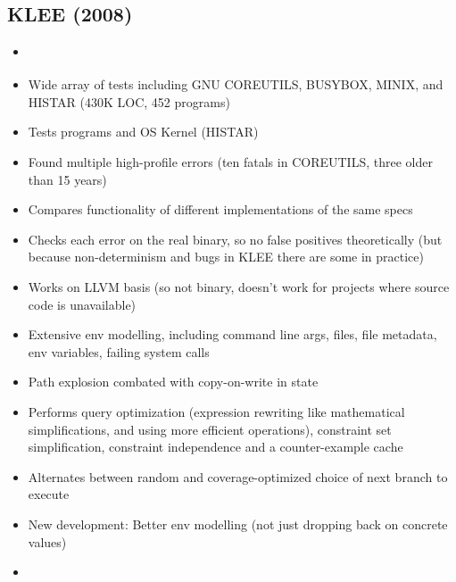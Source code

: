 \documentclass{article}
\begin{document}
\subsection{KLEE (2008)}
\begin{itemize}
  \item \cite{KLEE}
  \item Wide array of tests including GNU COREUTILS, BUSYBOX, MINIX, and HISTAR (430K LOC, 452 programs)
  \item Tests programs and OS Kernel (HISTAR)
  \item Found multiple high-profile errors (ten fatals in COREUTILS, three older than 15 years)
  \item Compares functionality of different implementations of the same specs
  \item Checks each error on the real binary, so no false positives theoretically (but because non-determinism and bugs in KLEE there are some in practice)
  \item Works on LLVM basis (so not binary, doesn't work for projects where source code is unavailable)
  \item Extensive env modelling, including command line args, files, file metadata, env variables, failing system calls
  \item Path explosion combated with copy-on-write in state
  \item Performs query optimization (expression rewriting like mathematical simplifications, and using more efficient operations), constraint set simplification, constraint independence and a counter-example cache
  \item Alternates between random and coverage-optimized choice of next branch to execute
  \item New development: Better env modelling (not just dropping back on concrete values)
  \item {}\cite{Science}
\end{itemize}
\end{document}
